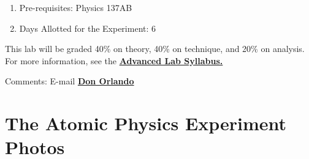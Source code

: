\documentclass{../lab}
\begin{document}
\begin{enumerate}
    \item Pre-requisites: Physics 137AB

    \item Days Allotted for the Experiment: 6

\end{enumerate}

This lab will be graded 40\% on theory, 40\% on technique, and 20\% on analysis. For more information, see the \href{\AdvancedLabSyllabus}{\textbf{Advanced Lab Syllabus.}}

Comments: E-mail \href{\MailDonOrlando}{\textbf{Don Orlando}}

\pagebreak 

\section{The Atomic Physics Experiment Photos}
\end{document}
